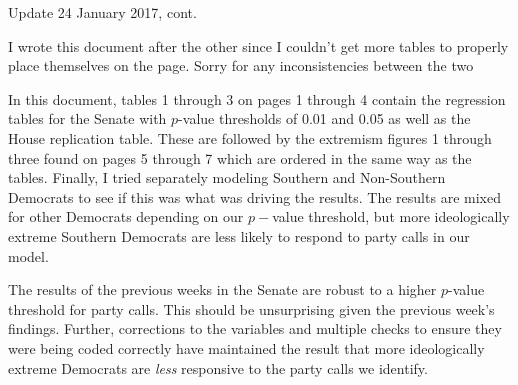 \documentclass[12pt]{article}
\begin{document}
	
	
\begin{center}
		\Large Update 24 January 2017, cont.
\end{center}

I wrote this document after the other since I couldn't get more tables to properly place themselves on the page. Sorry for any inconsistencies between the two

In this document, tables 1 through 3 on pages 1 through 4 contain the regression tables for the Senate with $p$-value thresholds of 0.01 and 0.05 as well as the House replication table. These are followed by the extremism figures 1 through three found on pages 5 through 7 which are ordered in the same way as the tables. Finally, I tried separately modeling Southern and Non-Southern Democrats to see if this was what was driving the results. The results are mixed for other Democrats depending on our $p-$value threshold, but more ideologically extreme Southern Democrats are less likely to respond to party calls in our model.

The results of the previous weeks in the Senate are robust to a higher $ p $-value threshold for party calls. This should be unsurprising given the previous week's findings. Further, corrections to the variables and multiple checks to ensure they were being coded correctly have maintained the result that more ideologically extreme Democrats are \textit{less} responsive to the party calls we identify. 
\end{document}
